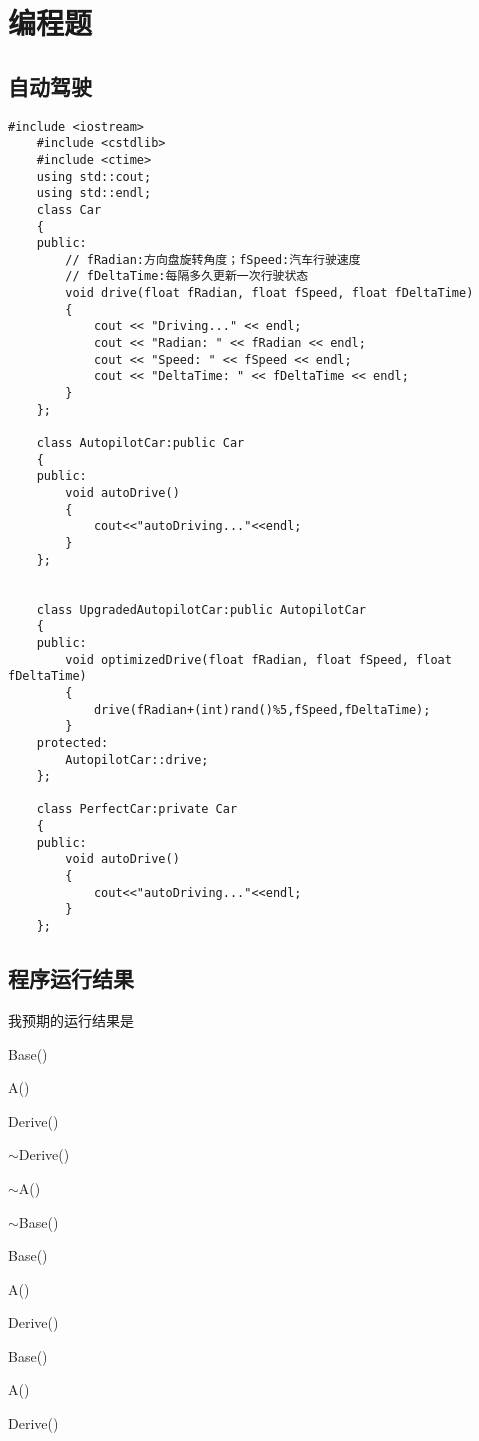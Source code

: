 \documentclass[UTF8]{ctexart}
\begin{document}
\section{编程题}
\subsection{自动驾驶}
\begin{lstlisting}[language={[ANSI]C++}]
    #include <iostream>
    #include <cstdlib>
    #include <ctime>
    using std::cout;
    using std::endl;
    class Car
    {
    public:
        // fRadian:方向盘旋转角度；fSpeed:汽车行驶速度
        // fDeltaTime:每隔多久更新一次行驶状态
        void drive(float fRadian, float fSpeed, float fDeltaTime)
        {
            cout << "Driving..." << endl;
            cout << "Radian: " << fRadian << endl;
            cout << "Speed: " << fSpeed << endl;
            cout << "DeltaTime: " << fDeltaTime << endl;
        }
    };
    
    class AutopilotCar:public Car
    {
    public:
        void autoDrive()
        {
            cout<<"autoDriving..."<<endl;
        }
    };
    
    
    class UpgradedAutopilotCar:public AutopilotCar
    {
    public:
        void optimizedDrive(float fRadian, float fSpeed, float fDeltaTime)
        {
            drive(fRadian+(int)rand()%5,fSpeed,fDeltaTime);
        }
    protected:
        AutopilotCar::drive;
    };
    
    class PerfectCar:private Car
    {
    public:
        void autoDrive()
        {
            cout<<"autoDriving..."<<endl;
        }
    };
 \end{lstlisting}

\subsection{程序运行结果}
我预期的运行结果是


Base()

A()

Derive()

$\sim$Derive()

$\sim$A()

$\sim$Base()

Base()

A()

Derive()

Base()

A()

Derive()
\end{document}
